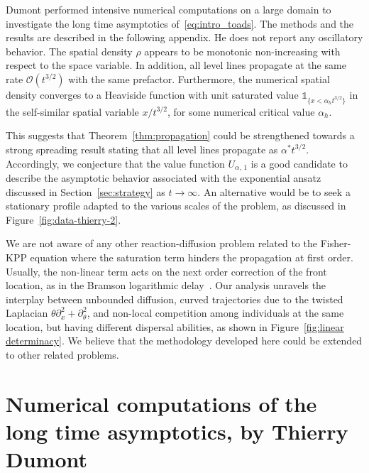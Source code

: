\documentclass[10pt]{amsart}
\theoremstyle{definition}\newtheorem{defi}[theo]{Definition}\newtheorem{rema}[theo]{Remark}\newtheorem{exam}[theo]{Example}\newtheorem{exem}[theo]{Example}\newtheorem{nota}[theo]{Notation}
\newcommand{\mO}{\mathcal{O}}
\newcommand{\1}{\mathds{1}}
\begin{document}
Dumont performed intensive numerical computations on a large domain to investigate the long time asymptotics of~\eqref{eq:intro_toads}. The methods and the results are described in the following appendix. He does not report any oscillatory behavior. The spatial density $\rho$ appears to be monotonic non-increasing with respect to the space variable. In addition, all level lines propagate at the same rate $\mO(t^{3/2})$ with the same prefactor. Furthermore, the numerical spatial density converges to a Heaviside function with unit saturated value $\1_{\{x< \alpha_h t^{3/2}\}}$ in the self-similar spatial variable $x/t^{3/2}$, for some numerical critical value $\alpha_h$.

This suggests that Theorem~\ref{thm:propagation} could be strengthened towards a strong spreading result stating that all level lines propagate as $\alpha^* t^{3/2}$. Accordingly, we conjecture that the value function $U_{\alpha,\,1}$ is a good candidate to describe the asymptotic behavior associated with the exponential ansatz discussed in Section~\ref{sec:strategy} as $t\to \infty$. An alternative would be to seek a stationary profile adapted to the various scales of the problem, as discussed in Figure~\ref{fig:data-thierry-2}.

We are not aware of any other reaction-diffusion problem related to the Fisher-KPP equation where the saturation term hinders the propagation at first order. Usually, the non-linear term acts on the next order correction of the front location, as in the Bramson logarithmic delay~\cite{BHR_LogDelay,Bramson83,HNRR13,Penington}. Our analysis unravels the interplay between unbounded diffusion, curved trajectories due to the twisted Laplacian $\theta \partial^2_x + \partial^2_\theta$, and non-local competition among individuals at the same location, but having different dispersal abilities, as shown in Figure~\ref{fig:linear determinacy}. We believe that the methodology developed here could be extended to other related problems.






\appendix


\section{Numerical computations of the long time asymptotics, by Thierry Dumont}
\end{document}
